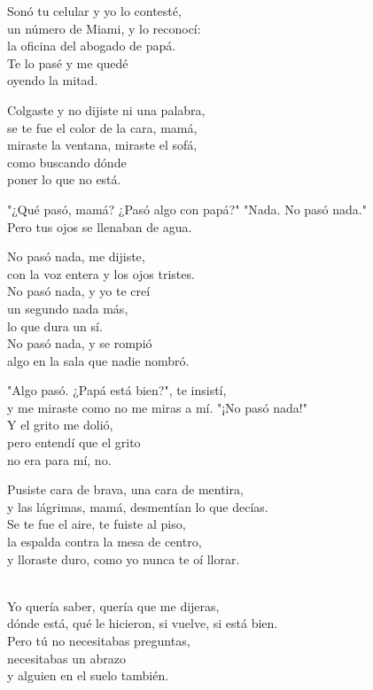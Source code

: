 \begin{lyrics}

Sonó tu celular y yo lo contesté,\\
un número de Miami, y lo reconocí:\\
la oficina del abogado de papá.\\
Te lo pasé y me quedé\\
oyendo la mitad.

Colgaste y no dijiste ni una palabra,\\
se te fue el color de la cara, mamá,\\
miraste la ventana, miraste el sofá,\\
como buscando dónde\\
poner lo que no está.

"¿Qué pasó, mamá? ¿Pasó algo con papá?"
"Nada. No pasó nada."\\
Pero tus ojos se llenaban de agua.

No pasó nada, me dijiste,\\
con la voz entera y los ojos tristes.\\
No pasó nada, y yo te creí\\
un segundo nada más,\\
lo que dura un sí.\\
No pasó nada, y se rompió\\
algo en la sala que nadie nombró.

"Algo pasó. ¿Papá está bien?", te insistí,\\
y me miraste como no me miras a mí.
"¡No pasó nada!"
\\
Y el grito me dolió,\\
pero entendí que el grito\\
no era para mí, no.

Pusiste cara de brava, una cara de mentira,\\
y las lágrimas, mamá, desmentían lo que decías.\\
Se te fue el aire, te fuiste al piso,\\
la espalda contra la mesa de centro,\\
y lloraste duro, como yo nunca te oí llorar.

\\
Yo quería saber, quería que me dijeras,\\
dónde está, qué le hicieron, si vuelve, si está bien.\\
Pero tú no necesitabas preguntas,\\
necesitabas un abrazo\\
y alguien en el suelo también.


\end{lyrics}
